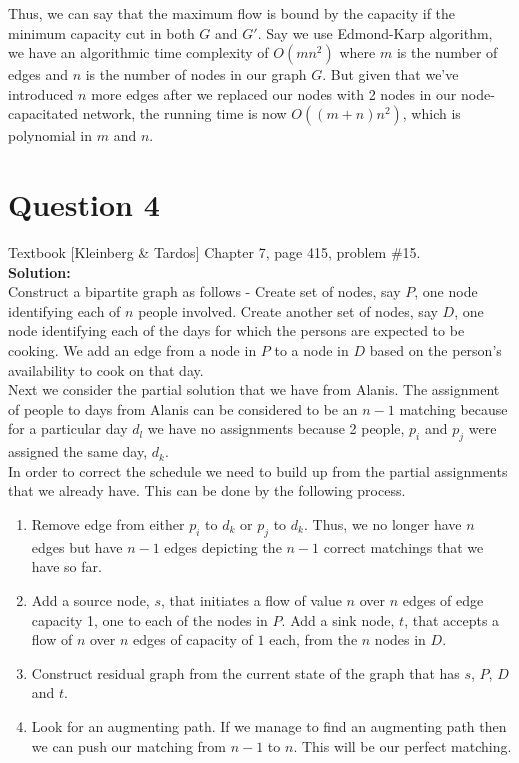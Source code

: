 \documentclass[11pt]{article}
\begin{document}
Thus, we can say that the maximum flow is bound by the capacity if the minimum capacity cut in both $ G $ and $ G' $. Say we use Edmond-Karp algorithm, we have an algorithmic time complexity of $ O(mn^2) $ where $ m $ is the number of edges and $ n $ is the number of nodes in our graph $ G $. But given that we've introduced $ n $ more edges after we replaced our nodes with 2 nodes in our node-capacitated network, the running time is now $ O((m+n)n^2) $, which is polynomial in $ m $ and $ n $.

\clearpage
\section{Question 4} Textbook [Kleinberg \& Tardos] Chapter 7, page 415, problem \#15. \\
\textbf{Solution:} \\

Construct a bipartite graph as follows - Create set of nodes, say $ P $, one node identifying each of $ n $ people involved. Create another set of nodes, say $ D $, one node identifying each of the days for which the persons are expected to be cooking. We add an edge from a node in $ P $ to a node in $ D $ based on the person's availability to cook on that day. \\

Next we consider the partial solution that we have from Alanis. The assignment of people to days from Alanis can be considered to be an $ n-1 $ matching because for a particular day $ d_l $ we have no assignments because 2 people, $ p_i $ and $ p_j $ were assigned the same day, $ d_k $. \\

In order to correct the schedule we need to build up from the partial assignments that we already have. This can be done by the following process.

\begin{enumerate}
	\item Remove edge from either $ p_i $ to $ d_k $ or $ p_j $ to $ d_k $. Thus, we no longer have $ n $ edges but have $ n-1 $ edges depicting the $ n-1 $ correct matchings that we have so far.
	\item Add a source node, $ s $, that initiates a flow of value $ n $ over $ n $ edges of edge capacity 1, one to each of the nodes in $ P $. Add a sink node, $ t $, that accepts a flow of $ n $ over $ n $ edges of capacity of $ 1 $ each, from the $ n $ nodes in $ D $.
	\item Construct residual graph from the current state of the graph that has $ s $, $ P $, $ D $ and $ t $.
	\item Look for an augmenting path. If we manage to find an augmenting path then we can push our matching from $ n-1 $ to $ n $. This will be our perfect matching.
\end{enumerate}
\end{document}

